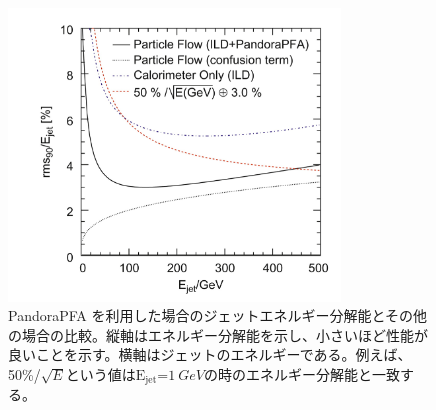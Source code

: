 \begin{figure}[H]
	\begin{center}
		\includegraphics[width=250pt]{./Figure/EcalDetector/PFA_per.png}
		\caption[PandoraPFA を利用した場合のジェットエネルギー分解能]{PandoraPFA を利用した場合のジェットエネルギー分解能とその他の場合の比較。縦軸はエネルギー分解能を示し、小さいほど性能が良いことを示す。横軸はジェットのエネルギーである。例えば、50\%/$\sqrt{E}$という値は$\mathrm{E}_{\mathrm{jet}}$=$\SI{1}{GeV}$の時のエネルギー分解能と一致する。}
		\label{PandoraPFA_res}
	\end{center}
\end{figure}







